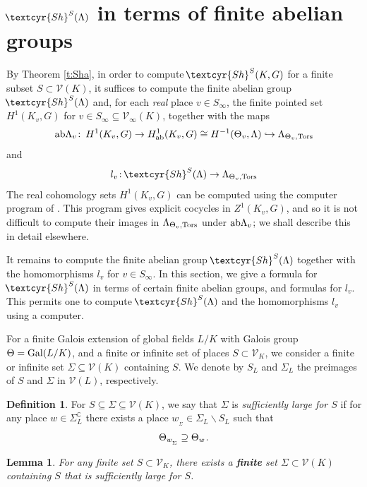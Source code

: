 \documentclass[11pt]{amsart}
\newcommand{\Sha}{{\!\textcyr{Sh}}}
\theoremstyle{plain}
\newtheorem{lemma}[theorem]{Lemma}
\theoremstyle{definition}
\newtheorem{definition}[theorem]{Definition}
\newcommand{\into}{\hookrightarrow}
\newcommand{\Gal}{{\rm Gal}}
\newcommand{\ab}{{\rm ab}}
\newcommand{\hs}{\kern 0.8pt}
\newcommand{\emm}{\bfseries}
\newcommand{\V}{{\mathcal V}}
\newcommand{\Tors}{{\rm Tors}}
\newcommand{\Thvt}{{\Theta_v,\Tors}}
\newcommand{\abLambda}{{{\rm ab}\Lambda}}
\begin{document}
\section{$\Sha^S(\Lambda)$ in terms of finite abelian groups}
\label{s:abelian}

By Theorem \ref{t:Sha}, in order to compute $\Sha^S(K,G)$ for a finite subset $S\subset \V(K)$, it suffices to compute the finite abelian group $\Sha^S(\Lambda)$ and, for each {\em real} place $v\in S_\infty$, the finite pointed set
$H^1(K_v,G)$ for $v\in S_\infty\subseteq\V_\infty(K)$,
together with the maps
\[\abLambda_v\colon\,  H^1(K_v,G)\to H^1_\ab(K_v,G)\cong H^{-1}(\Theta_v,\Lambda)\into  \Lambda_\Thvt\]
and
\[ l_v\colon \Sha^S(\Lambda)\to \Lambda_\Thvt\]
The real cohomology sets $H^1(K_v,G)$ can be computed using the computer program of \cite{BdG}.
This program gives explicit cocycles in $Z^1(K_v,G)$,
and so it is not difficult to compute their images in
$\Lambda_\Thvt$ under $\abLambda_v$; we shall describe this in detail elsewhere.

It remains to compute the finite abelian group $\Sha^S(\Lambda)$
together with the homomorphisms $l_v$ for $v\in S_\infty$.
In this section,  we give a formula for $\Sha^S(\Lambda)$
in terms of certain  finite abelian groups,
and  formulas for $l_v$.
This permits one to compute $\Sha^S(\Lambda)$ and the homomorphisms $l_v$ using a computer.

For a finite Galois extension of global fields $L/K$ with Galois group $\Theta=\Gal(L/K)$,
and  a finite or infinite  set of places $S\subset \V_K$,
we consider a finite or infinite set $\Sigma\subseteq\V(K)$ containing $S$.
We denote by $S_L$ and $\Sigma_L$ the preimages of  $S$ and $\Sigma$ in $\V(L)$,
respectively.

\begin{definition}\label{d:sl}
For $S\subseteq\Sigma\subseteq \V(K)$,
we say that  $\Sigma$ is {\em sufficiently large for $S$}
if for any place $w\in \Sigma_L^\complement$
there exists a  place $w_{_\Sigma}\in \Sigma_L\smallsetminus S_L$
such that
\begin{equation*}
\Theta_{w_{_\Sigma}}\supseteq \Theta_w\hs.
\end{equation*}
\end{definition}

\begin{lemma} \label{l:S-Sigma}
For any finite set $S\subset \V_K$,
there exists a {\emm finite} set $\Sigma\subset \V(K)$ containing $S$
that is sufficiently large for $S$.
\end{lemma}
\end{document}
